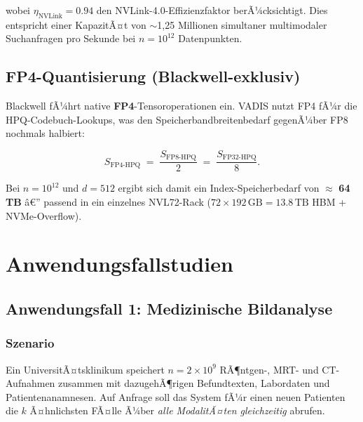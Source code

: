 ﻿\documentclass[12pt,a4paper]{article}
\begin{document}
wobei $\eta_{\text{NVLink}} = 0.94$ den NVLink-4.0-Effizienzfaktor
berÃ¼cksichtigt. Dies entspricht einer KapazitÃ¤t von
$\sim$1,25 Millionen simultaner multimodaler Suchanfragen pro Sekunde
bei $n = 10^{12}$ Datenpunkten.

\subsection{FP4-Quantisierung (Blackwell-exklusiv)}

Blackwell fÃ¼hrt native \textbf{FP4}-Tensoroperationen ein.
VADIS nutzt FP4 fÃ¼r die HPQ-Codebuch-Lookups, was den
Speicherbandbreitenbedarf gegenÃ¼ber FP8 nochmals halbiert:

\begin{equation}
  S_{\text{FP4-HPQ}} \;=\; \frac{S_{\text{FP8-HPQ}}}{2}
  \;=\; \frac{S_{\text{FP32-HPQ}}}{8}.
\end{equation}

Bei $n = 10^{12}$ und $d = 512$ ergibt sich damit ein
Index-Speicherbedarf von $\approx$ \textbf{64\,TB} â€” passend in
ein einzelnes NVL72-Rack ($72 \times 192\,\text{GB} = 13.8\,\text{TB}$
HBM + NVMe-Overflow).

\section{Anwendungsfallstudien}
\label{sec:anwendung}

\subsection{Anwendungsfall 1: Medizinische Bildanalyse}

\subsubsection{Szenario}
Ein UniversitÃ¤tsklinikum speichert $n = 2 \times 10^9$ RÃ¶ntgen-,
MRT- und CT-Aufnahmen zusammen mit dazugehÃ¶rigen Befundtexten,
Labordaten und Patientenanamnesen. Auf Anfrage soll das System
fÃ¼r einen neuen Patienten die $k$ Ã¤hnlichsten FÃ¤lle Ã¼ber
\emph{alle ModalitÃ¤ten gleichzeitig} abrufen.
\end{document}
